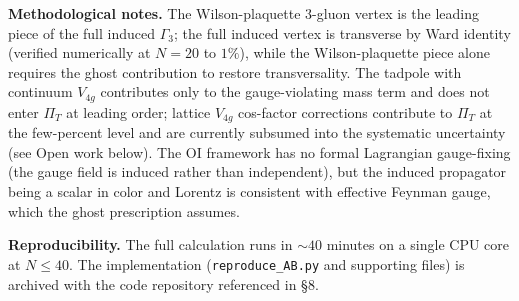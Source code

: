 \documentclass[
]{article}
\begin{document}
\textbf{Methodological notes.} The Wilson-plaquette 3-gluon vertex is
the leading piece of the full induced \(\Gamma_3\); the full induced
vertex is transverse by Ward identity (verified numerically at
\(N = 20\) to \(1\%\)), while the Wilson-plaquette piece alone requires
the ghost contribution to restore transversality. The tadpole with
continuum \(V_{4g}\) contributes only to the gauge-violating mass term
and does not enter \(\Pi_T\) at leading order; lattice \(V_{4g}\)
cos-factor corrections contribute to \(\Pi_T\) at the few-percent level
and are currently subsumed into the systematic uncertainty (see Open
work below). The OI framework has no formal Lagrangian gauge-fixing (the
gauge field is induced rather than independent), but the induced
propagator being a scalar in color and Lorentz is consistent with
effective Feynman gauge, which the ghost prescription assumes.

\textbf{Reproducibility.} The full calculation runs in \(\sim 40\)
minutes on a single CPU core at \(N \leq 40\). The implementation
(\texttt{reproduce\_AB.py} and supporting files) is archived with the
code repository referenced in §8.
\end{document}
